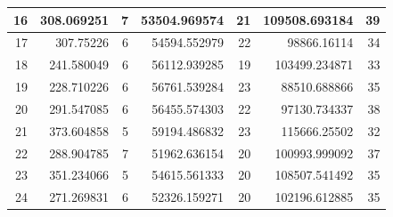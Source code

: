 \begin{table}
\begin{adjustwidth}{}{}
{{\begin{tabular}{|r|r|r|r|r|r|r|}
\hline
16                                         & 308.069251                   & 7                                     & 53504.969574                   & 21                                    & 109508.693184                & 39                                     \\ 
\hline
17                                         & 307.75226                    & 6                                     & 54594.552979                   & 22                                    & 98866.16114                  & 34                                     \\ 
\hline
18                                         & 241.580049                   & 6                                     & 56112.939285                   & 19                                    & 103499.234871                & 33                                     \\ 
\hline
19                                         & 228.710226                   & 6                                     & 56761.539284                   & 23                                    & 88510.688866                 & 35                                     \\ 
\hline
20                                         & 291.547085                   & 6                                     & 56455.574303                   & 22                                    & 97130.734337                 & 38                                     \\ 
\hline
21                                         & 373.604858                   & 5                                     & 59194.486832                   & 23                                    & 115666.25502                 & 32                                     \\ 
\hline
22                                         & 288.904785                   & 7                                     & 51962.636154                   & 20                                    & 100993.999092                & 37                                     \\ 
\hline
23                                         & 351.234066                   & 5                                     & 54615.561333                   & 20                                    & 108507.541492                & 35                                     \\ 
\hline
24                                         & 271.269831                   & 6                                     & 52326.159271                   & 20                                    & 102196.612885                & 35                                     \\ 

\end{tabular}}}
\end{adjustwidth}
\end{table}
